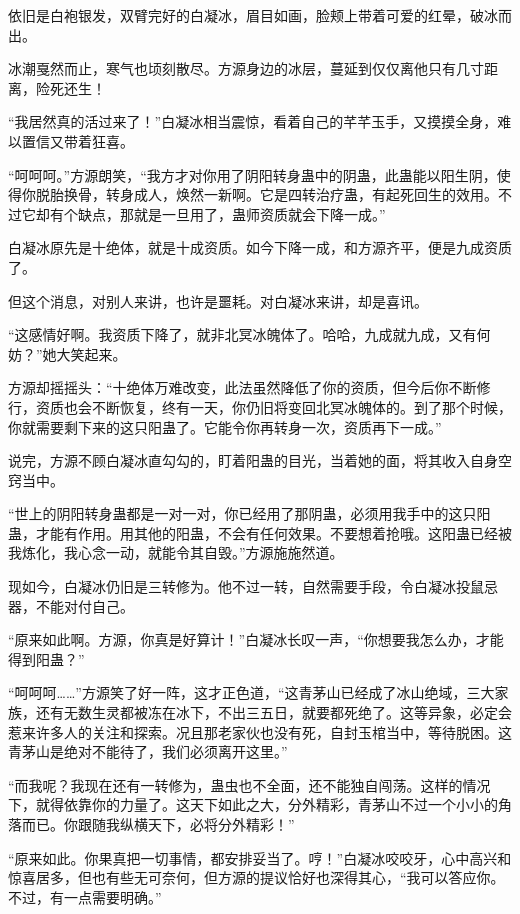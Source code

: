 \begin{this_body}
依旧是白袍银发，双臂完好的白凝冰，眉目如画，脸颊上带着可爱的红晕，破冰而出。

冰潮戛然而止，寒气也顷刻散尽。方源身边的冰层，蔓延到仅仅离他只有几寸距离，险死还生！

“我居然真的活过来了！”白凝冰相当震惊，看着自己的芊芊玉手，又摸摸全身，难以置信又带着狂喜。

“呵呵呵。”方源朗笑，“我方才对你用了阴阳转身蛊中的阴蛊，此蛊能以阳生阴，使得你脱胎换骨，转身成人，焕然一新啊。它是四转治疗蛊，有起死回生的效用。不过它却有个缺点，那就是一旦用了，蛊师资质就会下降一成。”

白凝冰原先是十绝体，就是十成资质。如今下降一成，和方源齐平，便是九成资质了。

但这个消息，对别人来讲，也许是噩耗。对白凝冰来讲，却是喜讯。

“这感情好啊。我资质下降了，就非北冥冰魄体了。哈哈，九成就九成，又有何妨？”她大笑起来。

方源却摇摇头：“十绝体万难改变，此法虽然降低了你的资质，但今后你不断修行，资质也会不断恢复，终有一天，你仍旧将变回北冥冰魄体的。到了那个时候，你就需要剩下来的这只阳蛊了。它能令你再转身一次，资质再下一成。”

说完，方源不顾白凝冰直勾勾的，盯着阳蛊的目光，当着她的面，将其收入自身空窍当中。

“世上的阴阳转身蛊都是一对一对，你已经用了那阴蛊，必须用我手中的这只阳蛊，才能有作用。用其他的阳蛊，不会有任何效果。不要想着抢哦。这阳蛊已经被我炼化，我心念一动，就能令其自毁。”方源施施然道。

现如今，白凝冰仍旧是三转修为。他不过一转，自然需要手段，令白凝冰投鼠忌器，不能对付自己。

“原来如此啊。方源，你真是好算计！”白凝冰长叹一声，“你想要我怎么办，才能得到阳蛊？”

“呵呵呵……”方源笑了好一阵，这才正色道，“这青茅山已经成了冰山绝域，三大家族，还有无数生灵都被冻在冰下，不出三五日，就要都死绝了。这等异象，必定会惹来许多人的关注和探索。况且那老家伙也没有死，自封玉棺当中，等待脱困。这青茅山是绝对不能待了，我们必须离开这里。”

“而我呢？我现在还有一转修为，蛊虫也不全面，还不能独自闯荡。这样的情况下，就得依靠你的力量了。这天下如此之大，分外精彩，青茅山不过一个小小的角落而已。你跟随我纵横天下，必将分外精彩！”

“原来如此。你果真把一切事情，都安排妥当了。哼！”白凝冰咬咬牙，心中高兴和惊喜居多，但也有些无可奈何，但方源的提议恰好也深得其心，“我可以答应你。不过，有一点需要明确。”


\end{this_body}
